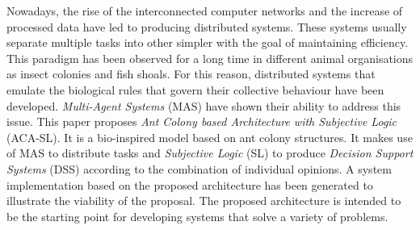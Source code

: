 Nowadays, the rise of the interconnected computer networks and the increase of processed data have led to producing distributed systems. These systems usually separate multiple tasks into other simpler with the goal of maintaining efficiency. This paradigm has been observed for a long time in different animal organisations as insect colonies and fish shoals. For this reason, distributed systems that emulate the biological rules that govern their collective behaviour have been developed. \emph{Multi-Agent Systems} (MAS) have shown their ability to address this issue. This paper proposes \emph{Ant Colony based Architecture with Subjective Logic} (ACA-SL). It is a bio-inspired model based on ant colony structures. It makes use of MAS to distribute tasks and \emph{Subjective Logic} (SL) to produce \emph{Decision Support Systems} (DSS) according to the combination of individual opinions. A system implementation based on the proposed architecture has been generated to illustrate the viability of the proposal. The proposed architecture is intended to be the starting point for developing systems that solve a variety of problems.


